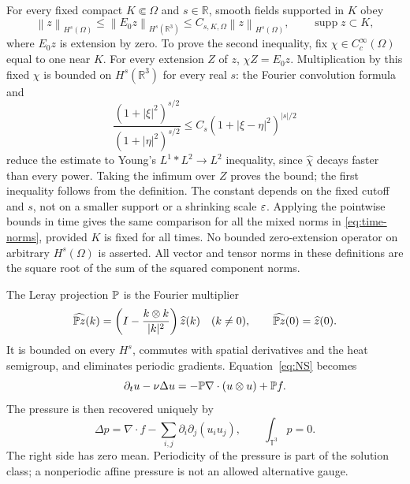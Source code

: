 \documentclass[11pt,a4paper]{article}
\theoremstyle{definition}\newtheorem{definition}[theorem]{Definition}
\theoremstyle{remark}\newtheorem{remark}[theorem]{Remark}
\newcommand{\R}{\mathbb R}\newcommand{\TT}{\mathbb T^3}
\newcommand{\norm}[1]{\left\lVert#1\right\rVert}
\begin{document}
For every fixed compact $K\Subset\Omega$ and $s\in\R$, smooth fields supported
in $K$ obey
\begin{equation}\label{eq:zero-extension}
 \norm{z}_{H^s(\Omega)}\le\norm{E_0z}_{H^s(\R^3)}
 \le C_{s,K,\Omega}\norm{z}_{H^s(\Omega)},
 \qquad \operatorname{supp}z\subset K,
\end{equation}
where $E_0z$ is extension by zero. To prove the second inequality, fix
$\chi\in C_c^\infty(\Omega)$ equal to one near $K$. For every extension $Z$
of $z$, $\chi Z=E_0z$. Multiplication by this fixed $\chi$ is bounded on
$H^s(\R^3)$ for every real $s$: the Fourier convolution formula and
\[
 \frac{(1+|\xi|^2)^{s/2}}{(1+|\eta|^2)^{s/2}}
 \le C_s(1+|\xi-\eta|^2)^{|s|/2}
\]
reduce the estimate to Young's $L^1*L^2\to L^2$ inequality, since
$\widehat\chi$ decays faster than every power. Taking the infimum over $Z$
proves the bound; the first inequality follows from the definition.
The constant depends on the fixed cutoff and $s$, not on a smaller support
or a shrinking scale $\varepsilon$. Applying the pointwise bounds in time gives the
same comparison for all the mixed norms in \eqref{eq:time-norms}, provided
$K$ is fixed for all times. No bounded zero-extension operator on arbitrary
$H^s(\Omega)$ is asserted. All vector and tensor norms in these definitions
are the square root of the sum of the squared component norms.

The Leray projection $\mathbb P$ is the Fourier multiplier
\[
 \widehat{\mathbb P z}(k)=
 \left(I-\frac{k\otimes k}{|k|^2}\right)\widehat z(k)\quad(k\ne0),
 \qquad \widehat{\mathbb P z}(0)=\widehat z(0).
\]
It is bounded on every $H^s$, commutes with spatial derivatives and the heat semigroup, and eliminates periodic gradients. Equation~\eqref{eq:NS} becomes
\begin{equation}\label{eq:projected}
 \partial_tu-\nu\Delta u
 =-\mathbb P\nabla\cdot(u\otimes u)+\mathbb P f.
\end{equation}
The pressure is then recovered uniquely by
\[
 \Delta p=\nabla\cdot f-\sum_{i,j}\partial_i\partial_j(u_i u_j),
 \qquad \int_{\TT}p=0.
\]
The right side has zero mean. Periodicity of the pressure is part of the solution class; a nonperiodic affine pressure is not an allowed alternative gauge.
\end{document}
